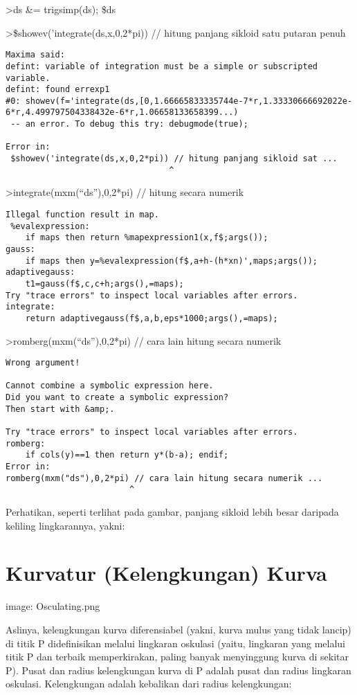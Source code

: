\documentclass[
]{book}
\begin{document}
\textgreater ds \&= trigsimp(ds); \$ds

\textgreater\$showev('integrate(ds,x,0,2*pi)) // hitung panjang sikloid satu putaran penuh

\begin{verbatim}
Maxima said:
defint: variable of integration must be a simple or subscripted variable.
defint: found errexp1
#0: showev(f='integrate(ds,[0,1.66665833335744e-7*r,1.33330666692022e-6*r,4.499797504338432e-6*r,1.06658133658399...)
 -- an error. To debug this try: debugmode(true);

Error in:
 $showev('integrate(ds,x,0,2*pi)) // hitung panjang sikloid sat ...
                                 ^
\end{verbatim}

\textgreater integrate(mxm(``ds''),0,2*pi) // hitung secara numerik

\begin{verbatim}
Illegal function result in map.
 %evalexpression:
    if maps then return %mapexpression1(x,f$;args());
gauss:
    if maps then y=%evalexpression(f$,a+h-(h*xn)',maps;args());
adaptivegauss:
    t1=gauss(f$,c,c+h;args(),=maps);
Try "trace errors" to inspect local variables after errors.
integrate:
    return adaptivegauss(f$,a,b,eps*1000;args(),=maps);
\end{verbatim}

\textgreater romberg(mxm(``ds''),0,2*pi) // cara lain hitung secara numerik

\begin{verbatim}
Wrong argument!

Cannot combine a symbolic expression here.
Did you want to create a symbolic expression?
Then start with &amp;.

Try "trace errors" to inspect local variables after errors.
romberg:
    if cols(y)==1 then return y*(b-a); endif;
Error in:
romberg(mxm("ds"),0,2*pi) // cara lain hitung secara numerik ...
                         ^
\end{verbatim}

Perhatikan, seperti terlihat pada gambar, panjang sikloid lebih besar daripada keliling lingkarannya, yakni:

\section{Kurvatur (Kelengkungan) Kurva}\label{kurvatur-kelengkungan-kurva}

image: Osculating.png

Aslinya, kelengkungan kurva diferensiabel (yakni, kurva mulus yang tidak lancip) di titik P didefinisikan melalui lingkaran oskulasi (yaitu, lingkaran yang melalui titik P dan terbaik memperkirakan, paling banyak menyinggung kurva di sekitar P). Pusat dan radius kelengkungan kurva di P adalah pusat dan radius lingkaran oskulasi. Kelengkungan adalah kebalikan dari radius kelengkungan:
\end{document}

